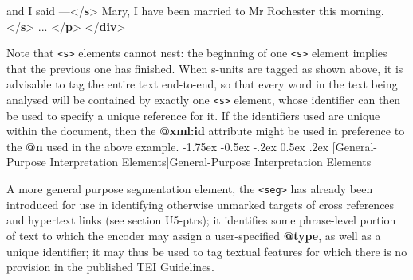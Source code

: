 \documentclass[11pt,twoside]{article}\makeatletter
\makeatletter
\renewcommand\section{\@startsection {section}{1}{\z@}%
     {-1.75ex \@plus -0.5ex \@minus -.2ex}%
     {0.5ex \@plus .2ex}%
     {\reset@font\Large\bfseries\sffamily}}
\renewcommand\subsection{\@startsection{subsection}{2}{\z@}%
     {-1.75ex\@plus -0.5ex \@minus- .2ex}%
     {0.5ex \@plus .2ex}%
     {\reset@font\Large\sffamily}}
\def\DivII{\subsection}
\def\DivII{\section}
\makeatother
\begin{document}
\begin{shaded}
\hspace*{6pt}\hspace*{6pt}\hspace*{6pt}\hspace*{6pt} and I said —{</\textbf{s}>}\mbox{}\newline 
{}\mbox{}\newline 
{}\mbox{}\newline 
\hspace*{6pt}\mbox{}\newline 
\hspace*{6pt}\hspace*{6pt}Mary, I have been married to Mr Rochester\mbox{}\newline 
\hspace*{6pt}\hspace*{6pt}\hspace*{6pt}\hspace*{6pt}\hspace*{6pt}\hspace*{6pt} this morning.{</\textbf{s}>}\mbox{}\newline 
\hspace*{6pt} ... {</\textbf{p}>}\mbox{}\newline 
{</\textbf{div}>}\end{shaded}\egroup\par \noindent   Note that  \texttt{<s>} elements cannot nest: the beginning of one \texttt{<s>} element implies that the previous one has finished. When s-units are tagged as shown above, it is advisable to tag the entire text end-to-end, so that every word in the text being analysed will be contained by exactly one \texttt{<s>} element, whose identifier can then be used to specify a unique reference for it. If the identifiers used are unique within the document, then the \textbf{@xml:id} attribute might be used in preference to the \textbf{@n} used in the above  example.
\DivII[General-Purpose Interpretation Elements]{General-Purpose Interpretation Elements}\par
A more general purpose segmentation element, the \texttt{<seg>} has   already been introduced for use in identifying otherwise unmarked   targets of cross references and hypertext links (see section U5-ptrs); it identifies some phrase-level portion of text   to which the encoder may assign a user-specified \textbf{@type}, as   well as a unique identifier; it may thus be used to tag textual   features for which there is no provision in the published TEI   Guidelines.\par
\end{document}

